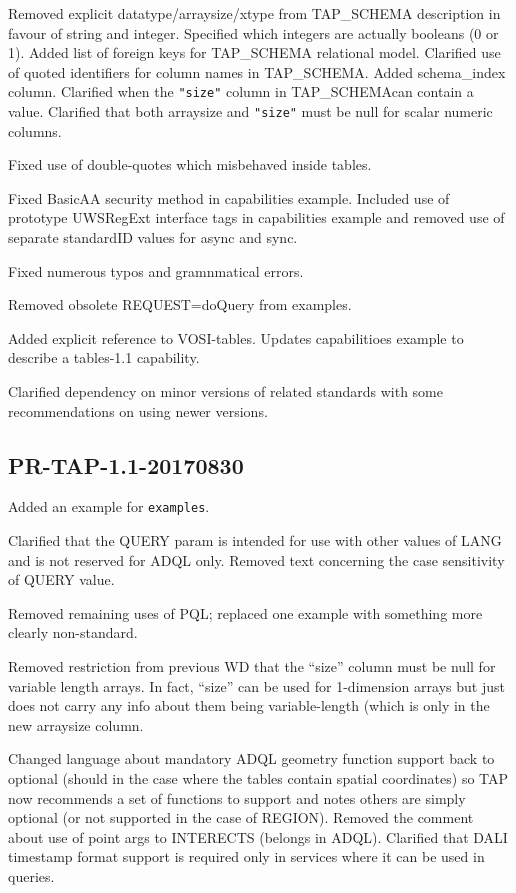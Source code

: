 \documentclass[11pt,letter]{ivoa}
\newcommand{\tapschema}{TAP\_SCHEMA}
\newcommand{\tapschema}{\mbox{%
  \relsize{-0.5}TAP\discretionary{-}{}{\kern-2pt\_}SCHEMA}}
\begin{document}
Removed explicit datatype/arraysize/xtype from \tapschema{} description
in favour of string and integer. Specified which integers are actually
booleans (0 or 1). Added list of foreign keys for \tapschema{}
relational model. Clarified use of quoted identifiers for column names in 
\tapschema. Added schema\_index column. Clarified when the \verb|"size"| column 
in \tapschema can contain a value. Clarified that both arraysize and \verb|"size"|
must be null for scalar numeric columns.

Fixed use of double-quotes which misbehaved inside tables. 

Fixed BasicAA security method in capabilities example. Included use of prototype
UWSRegExt interface tags in capabilities example and removed use of separate
standardID values for async and sync.

Fixed numerous typos and gramnmatical errors.

Removed obsolete REQUEST=doQuery from examples.

Added explicit reference to VOSI-tables. Updates capabilitioes example to describe a
tables-1.1 capability.

Clarified dependency on minor versions of related standards with some recommendations on
using newer versions.

\subsection{PR-TAP-1.1-20170830}

Added an example for \verb|examples|.

Clarified that the QUERY param is intended for use with other values of LANG and is not
reserved for ADQL only. Removed text concerning the case sensitivity of QUERY value.

Removed remaining uses of PQL; replaced one example with something more clearly non-standard.

Removed restriction from previous WD that the ``size'' column must be null for variable length arrays. In fact, ``size'' can be used for 1-dimension arrays but just does not carry any info about them being variable-length (which is only in the new arraysize column.

Changed language about mandatory ADQL geometry function support back to optional (should in
the case where the tables contain spatial coordinates) so TAP now recommends a set of functions to support and notes others are simply optional (or not supported in the case of REGION). Removed the comment about use of point args to INTERECTS (belongs in ADQL). Clarified that DALI timestamp format support is required only in services where it can be used in queries.
\end{document}
